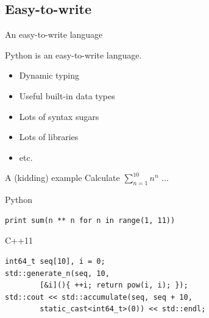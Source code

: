 \documentclass{beamer}
\begin{document}
\subsection{Easy-to-write}
\begin{frame}{An easy-to-write language}\pause
 \begin{block}{Python is an easy-to-write language.}\pause
  \begin{itemize}
   \item Dynamic typing\pause
   \item Useful built-in data types\pause
   \item Lots of syntax sugars\pause
   \item Lots of libraries\pause
   \item etc.
  \end{itemize}
 \end{block}
\end{frame}

\begin{frame}[fragile]{A (kidding) example}
Calculate $\displaystyle\sum_{n=1}^{10} n ^ n$ ...
\pause
\begin{block}{Python}
\begin{verbatim}
print sum(n ** n for n in range(1, 11))
\end{verbatim}
\end{block}
\pause
\begin{block}{C++11}
\begin{verbatim}
int64_t seq[10], i = 0;
std::generate_n(seq, 10,
        [&i](){ ++i; return pow(i, i); });
std::cout << std::accumulate(seq, seq + 10,
        static_cast<int64_t>(0)) << std::endl;
\end{verbatim}
\end{block}
\end{frame}
\end{document}
